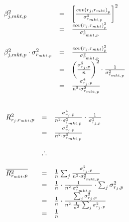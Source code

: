 \documentclass[12pt,]{article}
\begin{document}
\[\begin{array}{l c l}
  \beta_{j, mkt, p}^{2} & = & \left [ \frac{cov \left ( r_{j}, r_{mkt} \right )_{p}}{\sigma_{r_{mkt, p}}^{2}} \right ]^{2} \\
                        & = & \frac{cov \left ( r_{j}, r_{mkt} \right )_{p}^{2}}{\sigma_{r_{mkt, p}}^{4}} \\ \\
  \beta_{j, mkt, p}^{2} \cdot  \sigma_{r_{mkt, p}}^{2}  & = & \frac{cov \left ( r_{j}, r_{mkt} \right )_{p}^{2}}{\sigma_{r_{mkt, p}}^{2}} \\
                                                        & = & \left ( \frac{\sigma_{r_{j}, p}^{2}}{n} \right )^{2} \cdot \frac{1}{\sigma_{r_{mkt, p}}^{2}} \\
                                                        & = & \frac{\sigma_{r_{j}, p}^{4}}{n^{2} \cdot \sigma_{r_{mkt, p}}^{2}} \\ \\
\end{array}
\]

\newpage

\[
\begin{array}{l c l}
  R_{r_{j}, r_{mkt}, p}^{2} & = & \frac{\sigma_{r_{j}, p}^{4}}{n^{2} \cdot \sigma_{r_{mkt, p}}^{2}} \cdot \frac{1}{\sigma_{r_{j, p}}^{2}} \\
                            & = & \frac{\sigma_{r_{j}, p}^{2}}{n^{2} \cdot \sigma_{r_{mkt, p}}^{2}} \\ \\  
                            & \therefore  & \\ \\
  \overline{R_{r_{mkt}, p}^{2}} & = & \frac{1}{n} \sum_{j} \frac{\sigma_{r_{j}, p}^{2}}{n^{2} \cdot \sigma_{r_{mkt, p}}^{2}} \\
                                & = & \frac{1}{n} \cdot \frac{1}{n^{2} \cdot \sigma_{r_{mkt, p}}^{2}} \cdot \sum_{j} \sigma_{r_{j}, p}^{2} \\
                                & = & \frac{1}{n} \cdot \frac{\sum_{j} \sigma_{r_{j}, p}^{2}}{n^{2} \cdot \frac{1}{n^{2}} \cdot \sum_{j} \sigma_{r_{j}, p}^{2}} \\
                                & = & \frac{1}{n} \\
\end{array}
\]

\newpage


\end{document}
